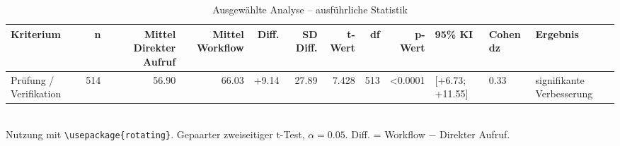 \begin{table}
\centering
\caption{Ausgewählte Analyse -- ausführliche Statistik}
\begin{tabular}{lrrrrrrrrlll}
\toprule
Kriterium & n & Mittel Direkter Aufruf & Mittel Workflow & Diff. & SD Diff. & t-Wert & df & p-Wert & 95\% KI & Cohen dz & Ergebnis \\
\midrule
Prüfung / Verifikation & 514 & 56.90 & 66.03 & +9.14 & 27.89 & 7.428 & 513 & <0.0001 & [+6.73; +11.55] & 0.33 & signifikante Verbesserung \\
\bottomrule
\end{tabular}
\\[2mm]
\footnotesize Nutzung mit \texttt{\textbackslash usepackage\{rotating\}}. Gepaarter zweiseitiger t-Test, $\alpha=0.05$. Diff. = Workflow $-$ Direkter Aufruf.
\end{table}

